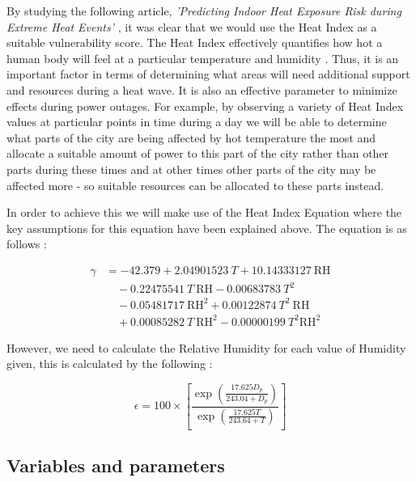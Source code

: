 \documentclass[11pt]{article}
\begin{document}
By studying the following article, \textit{'Predicting Indoor Heat Exposure Risk during Extreme Heat Events'} \cite{indoorheat}, it was clear that we would use the Heat Index as a suitable vulnerability score. The Heat Index effectively quantifies how hot a human body will feel at a particular temperature and humidity \cite{indoorheat}. Thus, it is an important factor in terms of determining what areas will need additional support and resources during a heat wave. It is also an effective parameter to minimize effects during power outages. For example, by observing a variety of Heat Index values at particular points in time during a day we will be able to determine what parts of the city are being affected by hot temperature the most and allocate a suitable amount of power to this part of the city rather than other parts during these times and at other times other parts of the city may be affected more - so suitable resources can be allocated to these parts instead.

In order to achieve this we will make use of the Heat Index Equation where the key assumptions for this equation have been explained above. The equation is as follows \cite{HIformula}:

\[
\begin{aligned}
\gamma &= -42.379 + 2.04901523 \ T + 10.14333127 \ \text{RH} \\
&\quad -0.22475541 \ T \ \text{RH} - 0.00683783  \ T^2 \\
&\quad - 0.05481717 \ \text{RH}^2 + 0.00122874\ T^2 \ \text{RH} \\
&\quad + 0.00085282 \ T \ \text{RH}^2 -0.00000199 \ T^2 \text{RH}^2
\end{aligned}
\]

However, we need to calculate the Relative Humidity for each value of Humidity given, this is calculated by the following \cite{relativeHumidity}:

\[
\epsilon = 100 \times \left[ \frac{\exp\left(\frac{17.625D_p}{243.04+D_p}\right)}{\exp\left(\frac{17.625T}{243.64+T}\right)} \right]
\]

\subsection{Variables and parameters}
\end{document}
